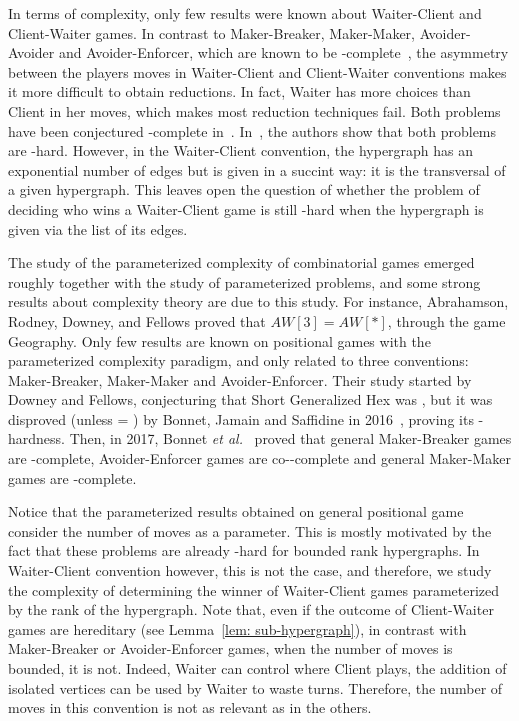 \documentclass{article}
\newcommand{\etal}{{\em et al.}\xspace}
\newcommand{\hedges}{edges\xspace}
\begin{document}
In terms of complexity, only few results were known about Waiter-Client and Client-Waiter games. In contrast to Maker-Breaker, Maker-Maker, Avoider-Avoider and Avoider-Enforcer, which are known to be \PSPACE-complete~\cite{Sch78, Bys04, BH19, RW21, GO23}, the asymmetry between the players moves in Waiter-Client and Client-Waiter conventions makes it more difficult to obtain reductions. In fact, Waiter has more choices than Client in her moves, which makes most reduction techniques fail. Both problems have been conjectured \PSPACE-complete in~\cite{CMP09}. In~\cite{CMP11}, the authors show that both problems are \NP-hard. However, in the Waiter-Client convention, the hypergraph has an exponential number of \hedges but is given in a succint way: it is the transversal of a given hypergraph. This leaves open the question of whether the problem of deciding who wins a Waiter-Client game is still \NP-hard when the hypergraph is given via the list of its edges.


The study of the parameterized complexity of combinatorial games emerged roughly together with the study of parameterized problems, and some strong results about complexity theory are due to this study. For instance, Abrahamson, Rodney, Downey, and Fellows\cite{Abr93} proved that $AW[3] = AW[*]$, through the game Geography.
Only few results are known
on positional games with the parameterized complexity paradigm, and only related to three conventions: Maker-Breaker, Maker-Maker and Avoider-Enforcer. Their study started by Downey and Fellows, conjecturing that {\sc Short Generalized Hex} was \FPT, but it was disproved (unless \FPT = \W[1]) by Bonnet, Jamain and Saffidine in 2016~\cite{Bon16}, proving its \W[1]-hardness. Then, in 2017, Bonnet \etal~\cite{Bon17} proved that general Maker-Breaker games are \W[1]-complete, Avoider-Enforcer games are co-\W[1]-complete and general Maker-Maker games are \AW[*]-complete.


Notice that the parameterized results obtained on general positional game consider the number of moves as a parameter. This is mostly motivated by the fact that these problems are already \PSPACE-hard for bounded rank hypergraphs. In Waiter-Client convention however, this is not the case, and therefore, we study the complexity of determining the winner of Waiter-Client games parameterized by the rank of the hypergraph. Note that, even if the outcome of Client-Waiter games are hereditary (see Lemma~\ref{lem: sub-hypergraph}), in contrast with Maker-Breaker or Avoider-Enforcer games, when the number of moves is bounded, it is not. Indeed, Waiter can control where Client plays, the addition of isolated vertices can be used by Waiter to waste turns. Therefore, the number of moves in this convention is not as relevant as in the others. 
\end{document}
